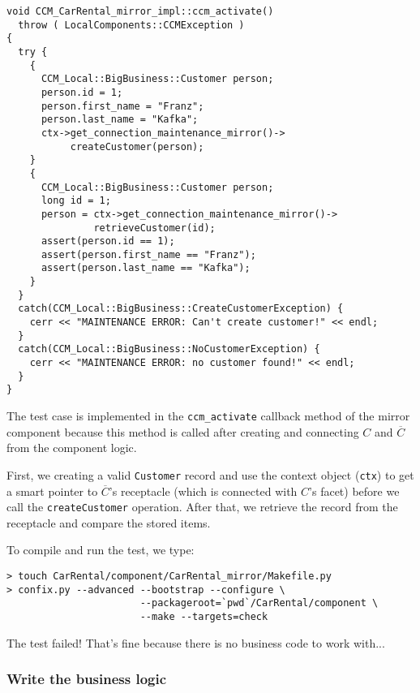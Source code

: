 \begin{small}
\begin{verbatim}
void CCM_CarRental_mirror_impl::ccm_activate()
  throw ( LocalComponents::CCMException )
{
  try {
    {
      CCM_Local::BigBusiness::Customer person;
      person.id = 1;
      person.first_name = "Franz";
      person.last_name = "Kafka";
      ctx->get_connection_maintenance_mirror()->
           createCustomer(person);
    }
    {
      CCM_Local::BigBusiness::Customer person;
      long id = 1;
      person = ctx->get_connection_maintenance_mirror()->
               retrieveCustomer(id);
      assert(person.id == 1);
      assert(person.first_name == "Franz");
      assert(person.last_name == "Kafka");
    }
  }
  catch(CCM_Local::BigBusiness::CreateCustomerException) {
    cerr << "MAINTENANCE ERROR: Can't create customer!" << endl;
  }
  catch(CCM_Local::BigBusiness::NoCustomerException) {
    cerr << "MAINTENANCE ERROR: no customer found!" << endl;
  }
}
\end{verbatim}
\end{small}
The test case is implemented in the {\tt ccm\_activate} callback method of the
mirror component because this method is called after creating and connecting $C$
and $\overline{C}$ from the component logic. 

First, we creating a valid {\tt Customer} record and  
use the context object ({\tt ctx}) to get a smart pointer
to $\overline{C}$'s receptacle (which is connected with $C$'s facet) 
before we call the {\tt createCustomer} operation. 
After that, we retrieve the record from the receptacle and compare the stored 
items.

To compile and run the test, we type:
\begin{small}
\begin{verbatim}
> touch CarRental/component/CarRental_mirror/Makefile.py
> confix.py --advanced --bootstrap --configure \
                       --packageroot=`pwd`/CarRental/component \
                       --make --targets=check
\end{verbatim}
\end{small}
The test failed! 
That's fine because there is no business code to work with...






\subsubsection{Write the business logic}

